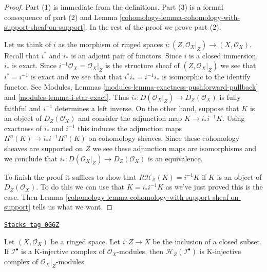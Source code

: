 \begin{proof}

Part (1) is immediate from the definitions. Part (3) is a formal
consequence of part (2) and
Lemma \ref{cohomology-lemma-cohomology-with-support-sheaf-on-support}.
In the rest of the proof we prove part (2).

\medskip\noindent
Let us think of $i$ as the morphism of ringed spaces
$i : (Z, \mathcal{O}_X|_Z) \to (X, \mathcal{O}_X)$.
Recall that $i^*$ and $i_*$ is an adjoint pair of functors.
Since $i$ is a closed immersion, $i_*$ is exact.
Since $i^{-1}\mathcal{O}_X = \mathcal{O}_X|_Z$ is the structure
sheaf of $(Z, \mathcal{O}_X|_Z)$ we see that $i^* = i^{-1}$
is exact and we see that that $i^*i_* = i^{-1}i_*$
is isomorphic to the identify functor. See
Modules, Lemmas \ref{modules-lemma-exactness-pushforward-pullback} and
\ref{modules-lemma-i-star-exact}. Thus
$i_* : D(\mathcal{O}_X|_Z) \to D_Z(\mathcal{O}_X)$
is fully faithful and $i^{-1}$ determines
a left inverse. On the other hand, suppose that $K$ is an object of
$D_Z(\mathcal{O}_X)$ and consider the adjunction map
$K \to i_*i^{-1}K$.
Using exactness of $i_*$ and $i^{-1}$ this induces the adjunction maps
$H^n(K) \to i_*i^{-1}H^n(K)$ on cohomology sheaves. Since these cohomology
sheaves are supported on $Z$ we see these adjunction maps are isomorphisms
and we conclude that $i_* : D(\mathcal{O}_X|_Z) \to D_Z(\mathcal{O}_X)$
is an equivalence.

\medskip\noindent
To finish the proof it suffices to show that $R\mathcal{H}_Z(K) = i^{-1}K$ if
$K$ is an object of $D_Z(\mathcal{O}_X)$. To do this we can use that
$K = i_*i^{-1}K$ as we've just proved this is the case. Then
Lemma \ref{cohomology-lemma-cohomology-with-support-sheaf-on-support}
tells us what we want.
\end{proof}

\begin{lemma}
\label{cohomology-lemma-sections-with-support-K-injective}
\href{https://stacks.math.columbia.edu/tag/0G6Z}{\texttt{Stacks tag 0G6Z}}

Let $(X, \mathcal{O}_X)$ be a ringed space. Let $i : Z \to X$
be the inclusion of a closed subset. If $\mathcal{I}^\bullet$ is a K-injective
complex of $\mathcal{O}_X$-modules, then
$\mathcal{H}_Z(\mathcal{I}^\bullet)$ is K-injective complex of
$\mathcal{O}_X|_Z$-modules.
\end{lemma}

